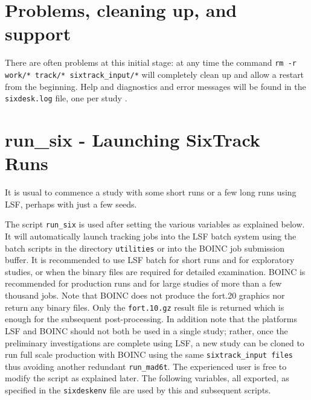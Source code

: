\documentclass{article}    %
\begin{document}
\section{Problems, cleaning up, and support} 
There are often problems at this initial stage: at any time the command
{\tt rm -r work/* track/* sixtrack\_input/*} will completely clean up
and allow a restart from the beginning. Help 
and diagnostics and error messages will be found
in the {\tt sixdesk.log} file, one per study \footnotemark.

\section{run\_six - Launching SixTrack Runs}
%
\label{sec:run_six}
It is usual to commence a study with some short runs or a 
few long runs using LSF, perhaps with just a few seeds.

The script {\tt run\_six} is used after setting the various
variables as explained below.
It will automatically launch tracking jobs into the LSF batch
system using the batch scripts in the directory {\tt utilities}
or into the BOINC job submission buffer.
It is recommended to use LSF batch for short runs and for exploratory studies,
or when the binary files are required for detailed examination.
BOINC is recommended for production runs and for large studies of more than 
a few thousand jobs. Note that BOINC does not produce the fort.20 graphics nor
return any binary files. Only the {\tt fort.10.gz}  result file is returned which is
enough for the subsequent post-processing. 
In addition note that the platforms LSF and BOINC should
not both be used in a single study; rather, once the preliminary investigations
are complete using LSF, a new study can be cloned to run full scale
production with BOINC using the same {\tt sixtrack\_input files} thus
avoiding another redundant {\tt run\_mad6t}. 
The experienced user is free to modify the script as explained later.
The following variables, all exported, as specified in the {\tt sixdeskenv} file
are used by this and subsequent scripts.
\end{document}
